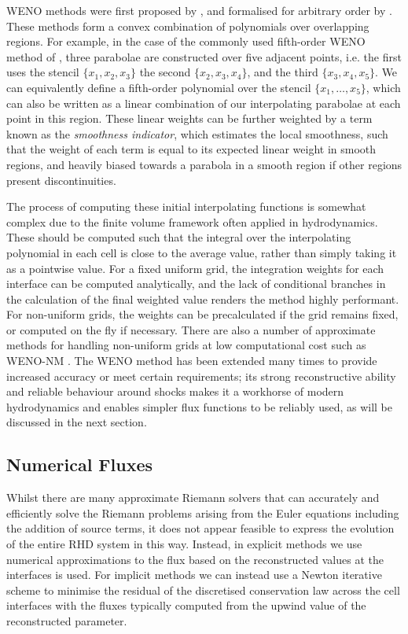 WENO methods were first proposed by \citet{Liu1994}, and formalised for arbitrary order by \citet{Jiang1996}.
These methods form a convex combination of polynomials over overlapping regions.
For example, in the case of the commonly used fifth-order WENO method of \citet{Jiang1996}, three parabolae are constructed over five adjacent points, i.e. the first uses the stencil $\{x_1, x_2, x_3\}$ the second $\{x_2, x_3, x_4\}$, and the third $\{x_3, x_4, x_5\}$.
We can equivalently define a fifth-order polynomial over the stencil $\{x_1, \ldots, x_5\}$, which can also be written as a linear combination of our interpolating parabolae at each point in this region.
These linear weights can be further weighted by a term known as the \emph{smoothness indicator}, which estimates the local smoothness, such that the weight of each term is equal to its expected linear weight in smooth regions, and heavily biased towards a parabola in a smooth region if other regions present discontinuities.

The process of computing these initial interpolating functions is somewhat complex due to the finite volume framework often applied in hydrodynamics.
These should be computed such that the integral over the interpolating polynomial in each cell is close to the average value, rather than simply taking it as a pointwise value.
For a fixed uniform grid, the integration weights for each interface can be computed analytically, and the lack of conditional branches in the calculation of the final weighted value renders the method highly performant.
For non-uniform grids, the weights can be precalculated if the grid remains fixed, or computed on the fly if necessary.
There are also a number of approximate methods for handling non-uniform grids at low computational cost such as WENO-NM \citep{Huang2018}.
The WENO method has been extended many times to provide increased accuracy or meet certain requirements; its strong reconstructive ability and reliable behaviour around shocks makes it a workhorse of modern hydrodynamics and enables simpler flux functions to be reliably used, as will be discussed in the next section.


\subsection{Numerical Fluxes}

Whilst there are many approximate Riemann solvers that can accurately and efficiently solve the Riemann problems arising from the Euler equations including the addition of source terms, it does not appear feasible to express the evolution of the entire RHD system in this way.
Instead, in explicit methods we use numerical approximations to the flux based on the reconstructed values at the interfaces is used.
For implicit methods we can instead use a Newton iterative scheme to minimise the residual of the discretised conservation law across the cell interfaces with the fluxes typically computed from the upwind value of the reconstructed parameter.

